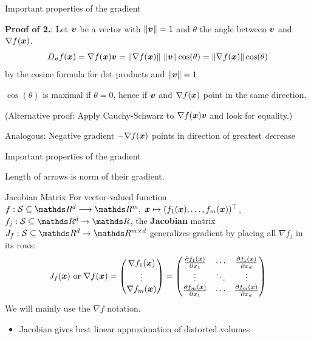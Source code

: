 \documentclass[11pt,compress,t,notes=noshow, xcolor=table]{beamer}
\begin{document}
\begin{framei}{Important properties of the gradient}
\item \textbf{Proof of 2.}: Let $\bm{v}$ be a vector with $\|\bm{v}\|=1$ and $\theta$ the angle between $\bm{v}$ and $\nabla f(\bm{x})$.
$$
D_{\bm{v}}f(\bm{x}) = \nabla f(\bm{x}) \bm{v} = \|\nabla f(\bm{x})\|~\|\bm{v}\|\cos(\theta) = \|\nabla f(\bm{x})\| \cos(\theta)
$$
by the cosine formula for dot products and $\|\bm{v}\| = 1$.
\item $\cos(\theta)$ is maximal if $\theta = 0$, hence if $\bm{v}$ and $\nabla f(\bm{x})$ point in the same direction.
\item (Alternative proof: Apply Cauchy-Schwarz to $\nabla f(\bm{x}) \bm{v}$ and look for equality.)
\item Analogous: Negative gradient $- \nabla f(\bm{x})$ points in direction of greatest \textit{de}crease
\end{framei}


\begin{framev}{Important properties of the gradient}
\begin{center}
\begin{footnotesize}
Length of arrows is norm of their gradient.
\end{footnotesize}
\end{center}
\end{framev}


\begin{framev}{Jacobian Matrix}
For vector-valued function~$f:\mathcal{S}\subseteq \R^d\longrightarrow\R^m,\; \xv\mapsto(f_1(\xv),\dots,f_m(\xv))^\top$, $f_j:\mathcal{S}\subseteq \R^d\to\R$, the \textbf{Jacobian} matrix $J_f:\mathcal{S}\subseteq \R^d \to \R^{m\times d}$ generalizes gradient by placing all $\nabla f_j$ in its rows:
$$
J_f(\bm{x}) \text{ or } \nabla f(\bm{x}) = \begin{pmatrix}
\nabla f_1(\bm{x}) \\
\vdots \\
\nabla f_m(\bm{x})
\end{pmatrix}
=
\begin{pmatrix}
\frac{\partial f_1(\bm{x})}{\partial x_1} & \cdots & \frac{\partial f_1(\bm{x})}{\partial x_d} \\
\vdots &  \ddots & \vdots \\
\frac{\partial f_m(\bm{x})}{\partial x_1} & \cdots & \frac{\partial f_m(\bm{x})}{\partial x_d}
\end{pmatrix}
$$
We will mainly use the $\nabla f$ notation.
\begin{itemize}
\item Jacobian gives best linear approximation of distorted volumes
\end{itemize}
\end{framev}
\end{document}
